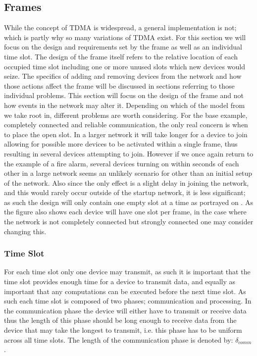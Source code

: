 \subsection{Frames}\label{GCRC:frame}
While the concept of TDMA is widespread, a general implementation is not; which is partly why so many variations of TDMA exist.
For this section we will focus on the design and requirements set by the frame as well as an individual time slot.
The design of the frame itself refers to the relative location of each occupied time slot including one or more unused slots which new devices would seize.
The specifics of adding and removing devices from the network and how those actions affect the frame will be discussed in sections referring to those individual problems.
This section will focus on the design of the frame and not how events in the network may alter it.
Depending on which of the model from  we take root in, different problems are worth considering.
For the base example, completely connected and reliable communication, the only real concern is when to place the open slot.
In a larger network it will take longer for a device to join allowing for possible more devices to be activated within a single frame, thus resulting in several devices attempting to join.
However if we once again return to the example of a fire alarm, several devices turning on within seconds of each other in a large network seems an unlikely scenario for other than an initial setup of the network.
Also since the only effect is a slight delay in joining the network, and this would rarely occur outside of the startup network, it is less significant; as such the design will only contain one empty slot at a time as portrayed on .
As the figure also shows each device will have one slot per frame, in the case where the network is not completely connected but strongly connected one may consider changing this.


\subsubsection*{Time Slot}
For each time slot only one device may transmit, as such it is important that the time slot provides enough time for a device to transmit data, and equally as important that any computations can be executed before the next time slot.
As such each time slot is composed of two phases; communication and processing.
In the communication phase the device will either have to transmit or receive data thus the length of this phase should be long enough to receive data from the device that may take the longest to transmit, i.e. this phase has to be uniform across all time slots.
The length of the communication phase is denoted by: $\delta_{comm}$.

